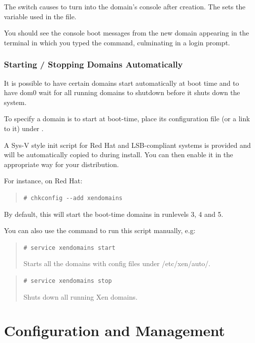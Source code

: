 \documentclass[11pt,twoside,final,openright]{report}
\begin{document}
The  switch causes  to turn into the domain's
console after creation.  The  sets the 
variable used in the  file.

You should see the console boot messages from the new domain appearing
in the terminal in which you typed the command, culminating in a login
prompt.


\section{Starting / Stopping Domains Automatically}

It is possible to have certain domains start automatically at boot
time and to have dom0 wait for all running domains to shutdown before
it shuts down the system.

To specify a domain is to start at boot-time, place its configuration
file (or a link to it) under .

A Sys-V style init script for Red Hat and LSB-compliant systems is
provided and will be automatically copied to 
during install.  You can then enable it in the appropriate way for
your distribution.

For instance, on Red Hat:

\begin{quote}
  \verb_# chkconfig --add xendomains_
\end{quote}

By default, this will start the boot-time domains in runlevels 3, 4
and 5.

You can also use the  command to run this script
manually, e.g:

\begin{quote}
  \verb_# service xendomains start_

  Starts all the domains with config files under /etc/xen/auto/.
\end{quote}

\begin{quote}
  \verb_# service xendomains stop_

  Shuts down all running Xen domains.
\end{quote}



\part{Configuration and Management}

\end{document}
